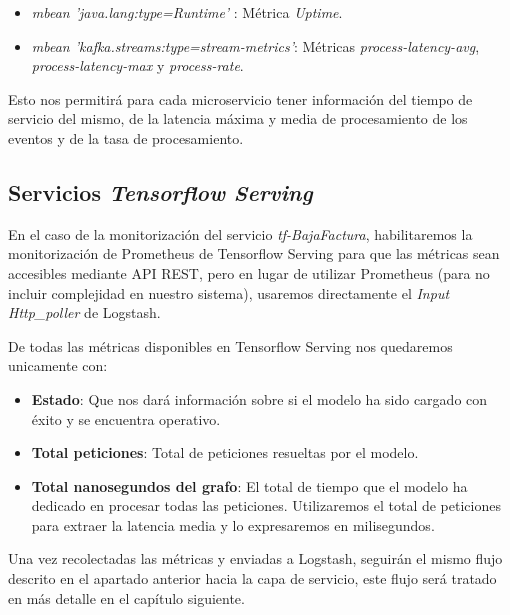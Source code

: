 \begin{itemize}
	\item \textit{mbean 'java.lang:type=Runtime'} : Métrica \textit{Uptime}.
	
	\item \textit{mbean 'kafka.streams:type=stream-metrics'}: Métricas \textit{process-latency-avg}, \textit{process-latency-max} y \textit{process-rate}.
\end{itemize}



Esto nos permitirá para cada microservicio tener información del tiempo de servicio del mismo, de la latencia máxima y media de procesamiento de los eventos y de la tasa de procesamiento. 





\subsection{Servicios \textit{Tensorflow Serving}}

En el caso de la monitorización del servicio \textit{tf-BajaFactura}, habilitaremos la monitorización de Prometheus de Tensorflow Serving para que las métricas sean accesibles mediante API REST, pero en lugar de utilizar Prometheus (para no incluir complejidad en nuestro sistema), usaremos directamente el \textit{Input} \textit{Http\_poller} de Logstash.

De todas las métricas disponibles en Tensorflow Serving nos quedaremos unicamente con: 

\begin{itemize}
\item \textbf{Estado}: Que nos dará información sobre si el modelo ha sido cargado con éxito y se encuentra operativo.  

\item \textbf{Total peticiones}: Total de peticiones resueltas por el modelo.

\item \textbf{Total nanosegundos del grafo}: El total de tiempo que el modelo ha dedicado en procesar todas las peticiones. Utilizaremos el total de peticiones para extraer la latencia media y lo expresaremos en milisegundos. 

\end{itemize}




Una vez recolectadas las métricas y enviadas a Logstash, seguirán el mismo flujo descrito en el apartado anterior hacia la capa de servicio, este flujo será tratado en más detalle en el capítulo siguiente. 

